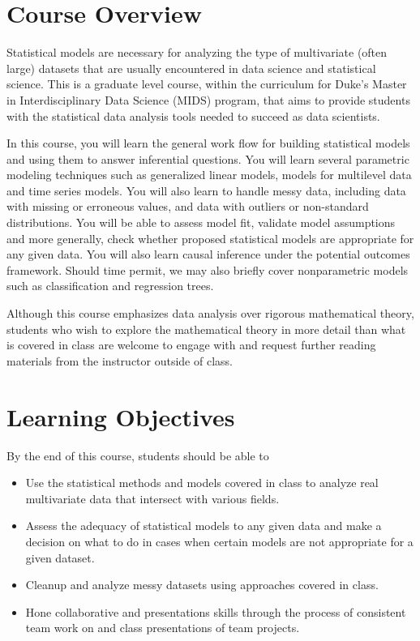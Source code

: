 \documentclass[11pt, a4paper]{article}
\begin{document}
\vspace{.5cm}
\setlength{\unitlength}{1in}
\renewcommand{\arraystretch}{1.5}



\section{Course Overview}
Statistical models are necessary for analyzing the type of multivariate (often large) datasets that are usually encountered in data science and statistical science. This is a graduate level course, within the curriculum for Duke's Master in Interdisciplinary Data Science (MIDS) program, that aims to provide students with the statistical data analysis tools needed to succeed as data scientists. 

In this course, you will learn the general work flow for building statistical models and using them to answer inferential questions. You will learn several parametric modeling techniques such as generalized linear models, models for multilevel data and time series models. You will also learn to handle messy data, including data with missing or erroneous values, and data with outliers or non-standard distributions. You will be able to assess model fit, validate model assumptions and more generally, check whether proposed statistical models are appropriate for any given data. You will also learn causal inference under the potential outcomes framework. Should time permit, we may also briefly cover nonparametric models such as classification and regression trees. 

Although this course emphasizes data analysis over rigorous mathematical theory, students who wish to explore the mathematical theory in more detail than what is covered in class are welcome to engage with and request further reading materials from the instructor outside of class.


\section{Learning Objectives}
By the end of this course, students should be able to
\begin{itemize}[label= {\color{darkblue}{\ArrowBoldRightStrobe}}]
	\item Use the statistical methods and models covered in class to analyze real multivariate data that intersect with various fields. 
	\item Assess the adequacy of statistical models to any given data and make a decision on what to do in cases when certain models are not appropriate for a given dataset.
	\item Cleanup and analyze messy datasets using approaches covered in class.
	\item Hone collaborative and presentations skills through the process of consistent team work on and class presentations of team projects.
\end{itemize}
\end{document}
